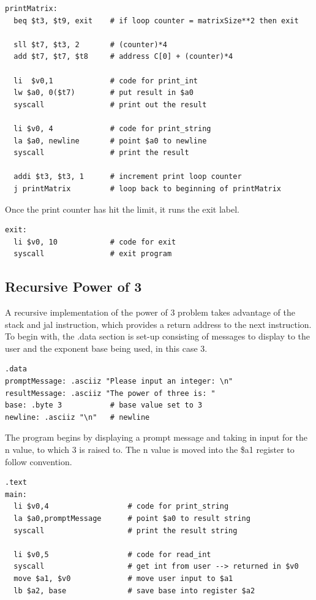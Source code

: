 \documentclass[twocolumn]{article}
\begin{document}
\begin{verbatim}
printMatrix:
  beq $t3, $t9, exit    # if loop counter = matrixSize**2 then exit
  
  sll $t7, $t3, 2       # (counter)*4
  add $t7, $t7, $t8     # address C[0] + (counter)*4
  
  li  $v0,1             # code for print_int
  lw $a0, 0($t7)        # put result in $a0
  syscall               # print out the result
  
  li $v0, 4             # code for print_string
  la $a0, newline       # point $a0 to newline
  syscall               # print the result
  
  addi $t3, $t3, 1      # increment print loop counter
  j printMatrix         # loop back to beginning of printMatrix
\end{verbatim}

Once the print counter has hit the limit, it runs the exit label. 

\begin{verbatim}
exit:
  li $v0, 10            # code for exit
  syscall               # exit program
\end{verbatim}

\subsection{Recursive Power of 3}

A recursive implementation of the power of 3 problem takes advantage of the stack and jal instruction, which provides a return address to the next instruction. \\

To begin with, the .data section is set-up consisting of messages to display to the user and the exponent base being used, in this case 3. 

\begin{verbatim}
.data
promptMessage: .asciiz "Please input an integer: \n" 
resultMessage: .asciiz "The power of three is: "
base: .byte 3     	    # base value set to 3
newline: .asciiz "\n"	# newline
\end{verbatim}

The program begins by displaying a prompt message and taking in input for the n value, to which 3 is raised to. The n value is moved into the \$a1 register to follow convention.

\begin{verbatim}
.text
main: 
  li $v0,4                  # code for print_string
  la $a0,promptMessage      # point $a0 to result string
  syscall                   # print the result string 
  
  li $v0,5                  # code for read_int
  syscall                   # get int from user --> returned in $v0
  move $a1, $v0             # move user input to $a1
  lb $a2, base              # save base into register $a2
\end{verbatim}
\end{document}
